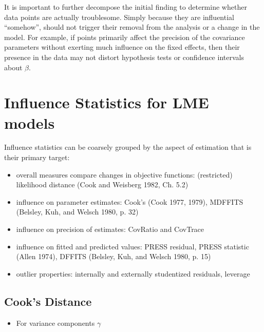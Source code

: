 \documentclass[Main.tex]{subfiles}
\begin{document}
		It is important to further decompose the initial finding to determine whether data points are actually troublesome.
		Simply because they are influential “somehow”, should not trigger their removal from the analysis or
		a change in the model. For example, if points primarily affect the precision of the covariance parameters
		without exerting much influence on the fixed effects, then their presence in the data may not distort hypothesis
		tests or confidence intervals about $\beta$.

		
			\section{Influence Statistics for LME models} %
			Influence statistics can be coarsely grouped by the aspect of estimation that is their primary target:
			\begin{itemize}
				\item overall measures compare changes in objective functions: (restricted) likelihood distance (Cook and Weisberg 1982, Ch. 5.2)
				\item influence on parameter estimates: Cook's  (Cook 1977, 1979), MDFFITS (Belsley, Kuh, and Welsch 1980, p. 32)
				\item influence on precision of estimates: CovRatio and CovTrace
				\item influence on fitted and predicted values: PRESS residual, PRESS statistic (Allen 1974), DFFITS (Belsley, Kuh, and Welsch 1980, p. 15)
				\item outlier properties: internally and externally studentized residuals, leverage
			\end{itemize}


	
	\subsection{Cook's Distance} %
	\begin{itemize}
		\item For variance components $\gamma$
	\end{itemize}
	
\end{document}
